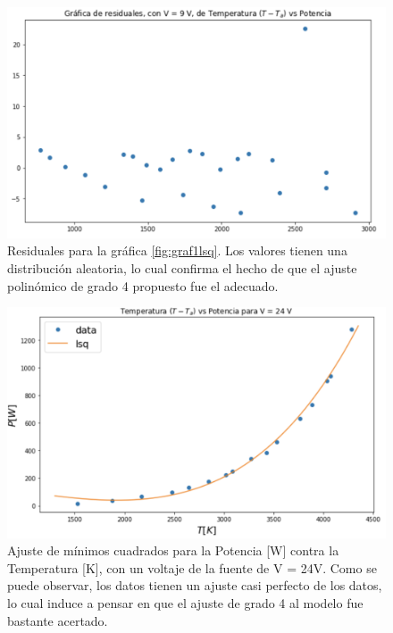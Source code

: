 \documentclass[%
 reprint,
 amsmath,amssymb,
 aps,
]{revtex4-1}
\begin{document}
\begin{figure}[H]
    \centering
    \includegraphics[scale= 0.3]{graf1Residuales.png}
    \caption{Residuales para la gráfica \ref{fig:graf1lsq}. Los valores tienen una distribución aleatoria, lo cual confirma el hecho de que el ajuste polinómico de grado 4 propuesto fue el adecuado.} 
    \label{fig:Figura 2}
\end{figure}

\begin{figure}[H]
    \centering
    \includegraphics[scale= 0.3]{graf2lsq.png}
    \caption{Ajuste de mínimos cuadrados para la Potencia [W] contra la Temperatura [K], con un voltaje de la fuente de V = 24V. Como se puede observar, los datos tienen un ajuste casi perfecto de los datos, lo cual induce a pensar en que el ajuste de grado 4 al modelo fue bastante acertado.}
    \label{fig:graf2lsq}
\end{figure}
\end{document}
